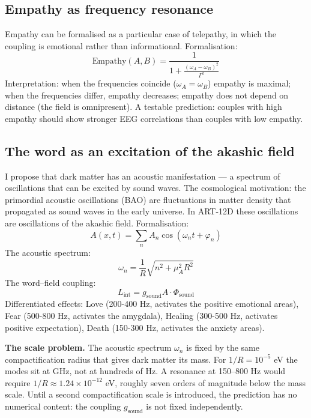 \documentclass[11pt,a4paper]{article}
\begin{document}
\subsection{Empathy as frequency resonance}
Empathy can be formalised as a particular case of telepathy, in which the coupling is emotional rather than informational. Formalisation:
\begin{equation}
\text{Empathy}(A,B) = \frac{1}{1 + \frac{(\omega_A - \omega_B)^2}{\Gamma^2}}
\end{equation}
Interpretation: when the frequencies coincide ($\omega_A = \omega_B$) empathy is maximal; when the frequencies differ, empathy decreases; empathy does not depend on distance (the field is omnipresent). A testable prediction: couples with high empathy should show stronger EEG correlations than couples with low empathy.

\subsection{The word as an excitation of the akashic field}
I propose that dark matter has an acoustic manifestation --- a spectrum of oscillations that can be excited by sound waves. The cosmological motivation: the primordial acoustic oscillations (BAO) are fluctuations in matter density that propagated as sound waves in the early universe. In ART-12D these oscillations are oscillations of the akashic field. Formalisation:
\begin{equation}
A(x,t) = \sum_n A_n \cos(\omega_n t + \varphi_n)
\end{equation}
The acoustic spectrum:
\begin{equation}
\omega_n = \frac{1}{R} \sqrt{n^2 + \mu_A^2 R^2}
\end{equation}
The word--field coupling:
\begin{equation}
L_{\text{int}} = g_{\text{sound}} A \cdot \Phi_{\text{sound}}
\end{equation}
Differentiated effects: Love (200-400 Hz, activates the positive emotional areas), Fear (500-800 Hz, activates the amygdala), Healing (300-500 Hz, activates positive expectation), Death (150-300 Hz, activates the anxiety areas).

\textbf{The scale problem.} The acoustic spectrum $\omega_n$ is fixed by the same compactification radius that gives dark matter its mass. For $1/R = 10^{-5}$ eV the modes sit at GHz, not at hundreds of Hz. A resonance at 150--800 Hz would require $1/R \approx 1.24\times10^{-12}$ eV, roughly seven orders of magnitude below the mass scale. Until a second compactification scale is introduced, the prediction has no numerical content: the coupling $g_{\text{sound}}$ is not fixed independently.
\end{document}

